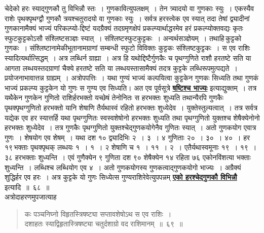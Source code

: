 \documentclass[11pt, openany]{book}
\begin{document}
{{ चेदेको हरः स्याद्गुणकौ तु विभिन्नौ स्तः~। गुणकावित्युपलक्षम्~। तेन
\newpage
\noindent त्र्यादयो वा गुणकाः स्युः~। एकस्यैव राशेः पृथक्पृथग्द्वौ गुणकौ
त्रयश्चतुरादयो वा गुणकाः स्युः~। सर्वत्र हरस्त्वेक एव स्यात् तदा तेषां द्व्यादीनां
गुणकानामैक्यं भाज्यं परिकल्प्यो-द्दिष्टं यदग्रैक्यं तदग्रमृणक्षेपं
प्रकल्प्यार्थाद्धरमेव हरं प्रकल्प्योक्तवद्यः
 कृतः स्फुटकुट्टकोऽसौ संश्लिष्टसञ्ज्ञः स्यात्~।
संश्लिष्टस्फुटकुट्टकः~। अन्वर्थसञ्ज्ञेयम्~।
 तथाहि\textendash \,कुट्टको गुणकः~। संश्लिष्टानामेकीभूतानामग्राणां सम्बन्धी स्फुटो विविक्तः
 कुट्टकः संश्लिष्टकुट्टकः~। स एव राशिः स्यादित्यर्थात्सिद्धम्~। अत्र
लब्धिर्न ग्राह्या~।
 अत्र हि यथोद्दिष्टैर्गुणकैः च पृथग्गुणिते राशौ हरतष्टे सति या आगता
लब्धयस्तदग्राणां 
 चैक्ये हरतष्टे सति या लब्धयस्तासामैक्यं तदत्र कुट्टके
लब्धिरूपमुत्पद्यते~।
 प्रयोजनाभावात्तन्न ग्राह्यम्~। अत्रोपपत्तिः~। यथा गुण्यं भाज्यं
कल्पयित्वा कुट्टकेन
 गुणकः सिध्यति तथा गुणकं भाज्यं प्रकल्प्य कुट्टकेन यो गुणः स गुण्य एव
सिध्यति। अत एव पूर्वसूत्रे \hyperref[67]{\textbf{षष्टिश्च भाज्यः}} इत्याद्युक्तम्~। तत्र
यथैकेन गुणकेन
 गुणितो राशिर्हरभक्तो यच्छेषं तेनोनितः स हरभक्तः शुध्यति तथान्यैरपि
गुणकैः
 पृथक्पृथग्गुणितो हरभक्तो यानि  शेषाणि तैर्यथास्वं रहितो हरभक्तः
शुध्येदेव~। युक्तेस्तुल्यत्वात्~। तत्र सर्वत्र यद्येक एव हर स्यात्तर्हि यथा
पृथग्गुणितः स्वस्वशेषोनो
 हरभक्तः शुध्यति तथा पृथग्गुणितो युक्तश्च शेषैक्येनोनो हरभक्तः
शुध्येदेव~। तत्र
 गुणकैः पृथग्गुणितो युक्तश्चेद्गुणकयोगेनैव गुणितः स्यात्~। अतो
गुणकयोग
एवात्र गुणः~। शेषयोग एव शेषम्~। यथा दश १० द्व्यादिभिः २~। ३~। ४
गुणिताः २०~। ३०~। ४०~। हर\textendash \,१९\textendash \,भक्ताः पृथक्पृथक् लब्धयः १~। १~। २ शेषाणि च
१~। ११~। २~। एतैर्यथास्वमूनाः १९~। १९~। ३८ हरभक्ताः शुध्यन्ति~। एवं
गुणैक्येन ९
 गुणिता दश ९० शेषैक्येन १४ रहिता ७६ एकोनविंशत्या भक्ताः शुध्यन्ति~।
 लब्धिश्च लब्धियोग एव ४~। अतो गुणकयोगस्य गुणकत्वाद्गुणकयोगो भाज्यः~।
 अग्रैक्यं शुद्धिर्हर एव हरः~। अत्र कुट्टके यो गुणः सिध्येत्स
गुण्यराशिरेवेत्युपपन्नम् \hyperref[68]{\textbf{एको हरश्चेद्गुणकौ विभिन्नौ}} इत्यादि~॥~६८~॥~\\
 
\vspace{-4mm}
 अत्रोदाहरणमुपजात्याह\textendash
\begin{quote}
    \eg 
     कः पञ्चनिघ्नो विहृतस्त्रिषष्ट्या सप्तावशेषोऽथ स एव राशिः~। \\
 दशाहतः स्याद्विहृतास्त्रिषष्ट्या चतुर्दशाग्रो वद राशिमानम्~॥~६९~॥
\end{quote}
\newpage

}}
\end{document}
